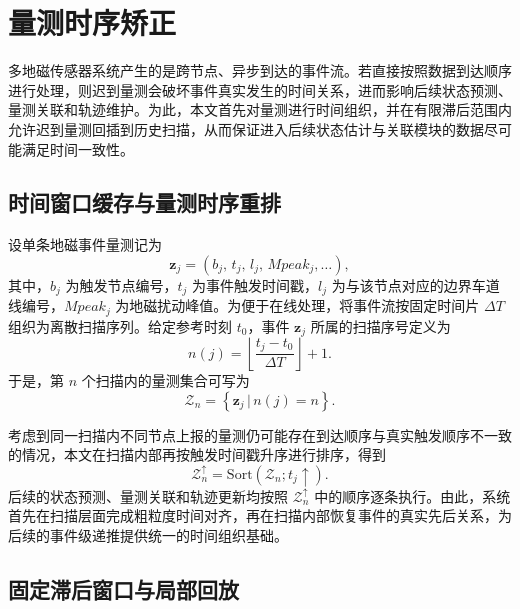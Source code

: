 \documentclass{xdupgthesis}
\begin{document}
\section{量测时序矫正}

多地磁传感器系统产生的是跨节点、异步到达的事件流。若直接按照数据到达顺序进行处理，则迟到量测会破坏事件真实发生的时间关系，进而影响后续状态预测、量测关联和轨迹维护。为此，本文首先对量测进行时间组织，并在有限滞后范围内允许迟到量测回插到历史扫描，从而保证进入后续状态估计与关联模块的数据尽可能满足时间一致性。

\subsection{时间窗口缓存与量测时序重排}

设单条地磁事件量测记为
\begin{equation}
	\mathbf z_j=\left(b_j,\,t_j,\,l_j,\,Mpeak_j,\ldots\right),
	\label{eq:ch3_event_def}
\end{equation}
其中，$b_j$ 为触发节点编号，$t_j$ 为事件触发时间戳，$l_j$ 为与该节点对应的边界车道线编号，$Mpeak_j$ 为地磁扰动峰值。为便于在线处理，将事件流按固定时间片 $\Delta T$ 组织为离散扫描序列。给定参考时刻 $t_0$，事件 $\mathbf z_j$ 所属的扫描序号定义为
\begin{equation}
	n(j)=\left\lfloor \frac{t_j-t_0}{\Delta T} \right\rfloor +1.
	\label{eq:ch3_scan_index}
\end{equation}
于是，第 $n$ 个扫描内的量测集合可写为
\begin{equation}
	\mathcal Z_n=
	\left\{
	\mathbf z_j\,\big|\, n(j)=n
	\right\}.
	\label{eq:ch3_scan_set}
\end{equation}

考虑到同一扫描内不同节点上报的量测仍可能存在到达顺序与真实触发顺序不一致的情况，本文在扫描内部再按触发时间戳升序进行排序，得到
\begin{equation}
	\mathcal Z_n^{\uparrow}=\mathrm{Sort}\left(\mathcal Z_n; t_j\uparrow\right).
	\label{eq:ch3_scan_sort}
\end{equation}
后续的状态预测、量测关联和轨迹更新均按照 $\mathcal Z_n^{\uparrow}$ 中的顺序逐条执行。由此，系统首先在扫描层面完成粗粒度时间对齐，再在扫描内部恢复事件的真实先后关系，为后续的事件级递推提供统一的时间组织基础。

\subsection{固定滞后窗口与局部回放}
\end{document}
